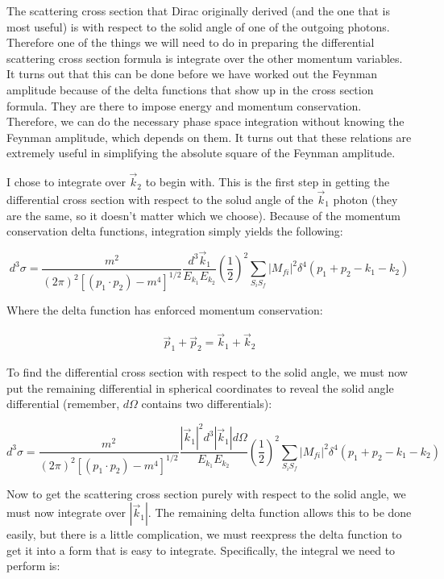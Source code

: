 \documentclass[a4]{article}
\begin{document}
    The scattering cross section that Dirac originally derived (and the one that is most useful) is with respect to the solid angle of one of the outgoing photons. Therefore one of the things we will need to do in preparing
    the differential scattering cross section formula is integrate over the other momentum variables. It turns out that this can be done before we have worked out the Feynman amplitude because of the delta functions that show
    up in the cross section formula. They are there to impose energy and momentum conservation. Therefore, we can do the necessary phase space integration without knowing the Feynman amplitude, which depends on them. It turns
    out that these relations are extremely useful in simplifying the absolute square of the Feynman amplitude.

    I chose to integrate over $\vec{k}_2$ to begin with. This is the first step in getting the differential cross section with respect to the solud angle of the $\vec{k}_1$ photon (they are the same, so it doesn't matter which
    we choose). Because of the momentum conservation delta functions, integration simply yields the following:

    \begin{equation}
        d^3 \sigma = \frac{m^2}{(2 \pi)^2 [(p_1 \cdot p_2) - m^4]^{1/2}} \frac{d^3 \vec{k}_1}{E_{k_1} E_{k_2}} (\frac{1}{2})^2 \sum_{S_i S_f} |M_{fi}|^2 \delta^4 (p_1 + p_2 - k_1 - k_2)
    \end{equation}

    Where the delta function has enforced momentum conservation:

    \begin{eqnarray}
        \vec{p}_1 + \vec{p}_2 = \vec{k}_1 + \vec{k}_2
    \end{eqnarray}

    To find the differential cross section with respect to the solid angle, we must now put the remaining differential in spherical coordinates to reveal the solid angle differential (remember, $d \Omega$ contains two differentials):

    \begin{equation}
        d^3 \sigma = \frac{m^2}{(2 \pi)^2 [(p_1 \cdot p_2) - m^4]^{1/2}} \frac{|\vec{k}_1|^2 d^3 |\vec{k}_1| d \Omega}{E_{k_1} E_{k_2}} (\frac{1}{2})^2 \sum_{S_i S_f} |M_{fi}|^2 \delta^4 (p_1 + p_2 - k_1 - k_2)
    \end{equation}

    Now to get the scattering cross section purely with respect to the solid angle, we must now integrate over $|\vec{k}_1|$. The remaining delta function allows this to be done easily, but there is a little complication, we must reexpress
    the delta function to get it into a form that is easy to integrate. Specifically, the integral we need to perform is:
\end{document}
